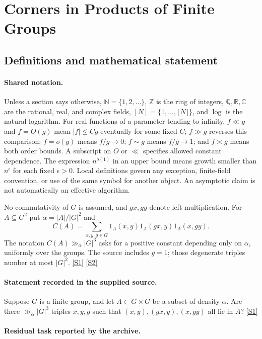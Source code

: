 \documentclass[11pt,a4paper]{article}
\newcommand{\N}{\mathbb{N}}
\newcommand{\Z}{\mathbb{Z}}
\newcommand{\Q}{\mathbb{Q}}
\newcommand{\R}{\mathbb{R}}
\newcommand{\C}{\mathbb{C}}
\newcommand{\sref}[2]{\hyperlink{source:#1:#2}{[S#2]}}
\begin{document}
\section{Corners in Products of Finite Groups}\label{statement}


\subsection{Definitions and mathematical statement}

\paragraph{Shared notation.}Unless a section says otherwise, $\N=\{1,2,\ldots\}$,
$\Z$ is the ring of integers, $\Q,\R,\C$ are the rational, real, and complex
fields, $[N]=\{1,\ldots,\lfloor N\rfloor\}$, and $\log$ is the natural
logarithm. For real functions of a parameter tending to infinity,
$f\ll g$ and $f=O(g)$ mean $|f|\leq Cg$ eventually for some fixed $C$;
$f\gg g$ reverses this comparison; $f=o(g)$ means $f/g\to0$;
$f\sim g$ means $f/g\to1$; and $f\asymp g$ means both order bounds.
A subscript on $O$ or $\ll$ specifies allowed constant dependence.
The expression $n^{o(1)}$ in an upper bound means growth smaller than
$n^\epsilon$ for each fixed $\epsilon>0$. Local definitions govern any
exception, finite-field convention, or use of the same symbol for another
object. An asymptotic claim is not automatically an effective algorithm.



No commutativity of $G$ is assumed, and $gx,gy$ denote left multiplication. For $A\subseteq G^2$ put $\alpha=|A|/|G|^2$ and
\[C(A)=\sum_{x,y,g\in G}1_A(x,y)1_A(gx,y)1_A(x,gy).\]
The notation $C(A)\gg_\alpha |G|^3$ asks for a positive constant depending only on $\alpha$, uniformly over the groups. The source includes $g=1$; those degenerate triples number at most $|G|^2$. \sref{statement}{1} \sref{statement}{2}

\paragraph{Statement recorded in the supplied source.}
Suppose $G$ is a finite group, and let $A \subset G \times G$ be a subset of density $\alpha$. Are there $\gg_\alpha |G|^3$ triples $x, y, g$ such that $(x, y), (gx, y), (x, gy)$ all lie in $A$? \sref{statement}{1}

\paragraph{Residual task reported by the archive.}
\end{document}
